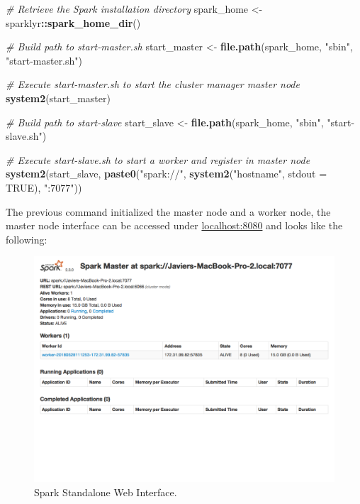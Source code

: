 \documentclass[]{book}
\newenvironment{Shaded}{\begin{snugshade}}{\end{snugshade}}
\newcommand{\CommentTok}[1]{\textcolor[rgb]{0.56,0.35,0.01}{\textit{#1}}}
\newcommand{\DataTypeTok}[1]{\textcolor[rgb]{0.13,0.29,0.53}{#1}}
\newcommand{\KeywordTok}[1]{\textcolor[rgb]{0.13,0.29,0.53}{\textbf{#1}}}
\newcommand{\NormalTok}[1]{#1}
\newcommand{\OperatorTok}[1]{\textcolor[rgb]{0.81,0.36,0.00}{\textbf{#1}}}
\newcommand{\OtherTok}[1]{\textcolor[rgb]{0.56,0.35,0.01}{#1}}
\newcommand{\StringTok}[1]{\textcolor[rgb]{0.31,0.60,0.02}{#1}}
\theoremstyle{definition}
\theoremstyle{definition}
\theoremstyle{definition}
\theoremstyle{remark}
\begin{document}
\begin{Shaded}
\begin{Highlighting}[]
\CommentTok{# Retrieve the Spark installation directory}
\NormalTok{spark_home <-}\StringTok{ }\NormalTok{sparklyr}\OperatorTok{::}\KeywordTok{spark_home_dir}\NormalTok{()}

\CommentTok{# Build path to start-master.sh}
\NormalTok{start_master <-}\StringTok{ }\KeywordTok{file.path}\NormalTok{(spark_home, }\StringTok{"sbin"}\NormalTok{, }\StringTok{"start-master.sh"}\NormalTok{)}

\CommentTok{# Execute start-master.sh to start the cluster manager master node}
\KeywordTok{system2}\NormalTok{(start_master)}

\CommentTok{# Build path to start-slave}
\NormalTok{start_slave <-}\StringTok{ }\KeywordTok{file.path}\NormalTok{(spark_home, }\StringTok{"sbin"}\NormalTok{, }\StringTok{"start-slave.sh"}\NormalTok{)}

\CommentTok{# Execute start-slave.sh to start a worker and register in master node}
\KeywordTok{system2}\NormalTok{(start_slave, }\KeywordTok{paste0}\NormalTok{(}\StringTok{"spark://"}\NormalTok{, }\KeywordTok{system2}\NormalTok{(}\StringTok{"hostname"}\NormalTok{, }\DataTypeTok{stdout =} \OtherTok{TRUE}\NormalTok{), }\StringTok{":7077"}\NormalTok{))}
\end{Highlighting}
\end{Shaded}

The previous command initialized the master node and a worker node, the
master node interface can be accessed under
\href{http://localhost:8080}{localhost:8080} and looks like the
following:

\begin{figure}

{\centering \includegraphics[width=13.78in]{images/05-clusters-spark-standalone-web-ui} 

}

\caption{Spark Standalone Web Interface.}\label{fig:spark-standalone-web-ui}
\end{figure}
\end{document}
